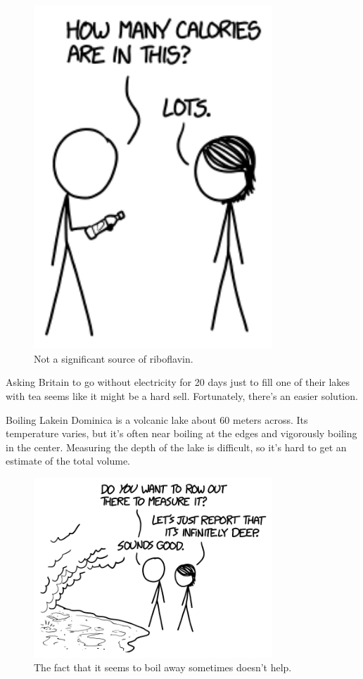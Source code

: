 {\begin{figure}[!htbp]
\centering
\includegraphics[scale=0.5, max width=0.8\textwidth]{imgs/a/79/tea_waterbottle.png}
\caption{Not a significant source of riboflavin.}
\end{figure}

{Asking Britain to go without electricity for 20 days just to fill one of their lakes with tea seems like it might be a hard sell. Fortunately, there's an easier solution.}

{Boiling Lakein Dominica is a volcanic lake about 60 meters across. Its temperature varies, but it's often near boiling at the edges and vigorously boiling in the center. Measuring the depth of the lake is difficult, so it's hard to get an estimate of the total volume.}

\begin{figure}[!htbp]
\centering
\includegraphics[scale=0.5, max width=0.8\textwidth]{imgs/a/79/tea_boiling.png}
\caption{The fact that it seems to boil away sometimes doesn't help.}
\end{figure}

}
